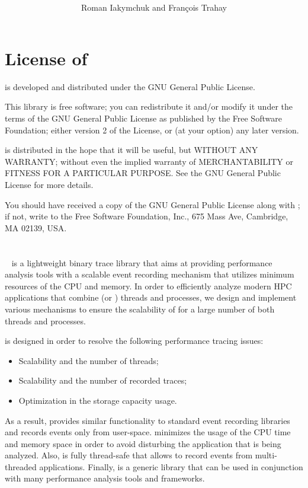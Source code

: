 

\title{
{\Huge\bf \reporttitle{}}\\[6mm]
{\LARGE\bf \reportsubtitle}\\[12mm]
{\Large\bf \reportsubsubtitle}}
\author{Roman Iakymchuk and Fran\c{c}ois Trahay}


\maketitle

\tableofcontents

\chapter{License of \litl}
\litl{} is developed and distributed under the GNU General Public License.

This library is free software; you can redistribute it and/or modify it under 
the terms of the GNU General Public License as published by the Free Software 
Foundation; either version 2 of the License, or (at your option) any later 
version.

\litl{} is distributed in the hope that it will be useful, but WITHOUT ANY 
WARRANTY; without even the implied warranty of MERCHANTABILITY or FITNESS FOR A 
PARTICULAR PURPOSE. See the GNU General Public License for more details.

You should have received a copy of the GNU General Public License along with 
\litl{}; if not, write to the Free Software Foundation, Inc., 675 Mass Ave, 
Cambridge, MA 02139, USA.


\chapter{\litl}
\litl{}~\cite{litl} is a lightweight binary trace library that aims at 
providing performance analysis tools with a scalable event recording mechanism 
that utilizes minimum resources of the CPU and memory. In order to efficiently 
analyze modern HPC applications that combine \openmp{} (or \pthread) threads 
and \mpi{} processes, we design and implement various mechanisms to ensure the 
scalability of \litl{} for a large  number of both threads and processes. 

\litl{} is designed in order to resolve the following performance tracing 
issues:
\begin{itemize}
 \item Scalability and the number of threads;
 \item Scalability and the number of recorded traces;
 \item Optimization in the storage capacity usage.
\end{itemize}
As a result, \litl{} provides similar functionality to standard event recording 
libraries and records events only from user-space. \litl{} minimizes the usage 
of the CPU time and memory space in order to avoid disturbing the application 
that is being analyzed. Also, \litl{} is fully thread-safe that allows to record 
events from multi-threaded applications. Finally, \litl{} is a generic library 
that can be used in conjunction with many performance analysis tools and 
frameworks. 


